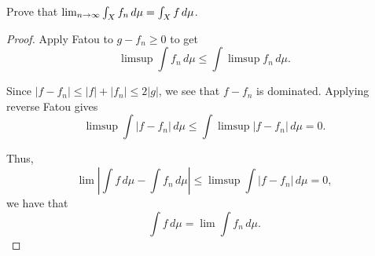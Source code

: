 \begin{itemize}
Prove that $\lim_{n \rightarrow \infty} \int_{X} f_n \, d\mu = \int_X f \, d\mu$. 
 
\begin{proof}
Apply Fatou to $g-f_n \geq 0$ to get \[\limsup\int f_n \, d\mu \leq \int\limsup f_n \, d\mu.\]

Since $|f-f_n| \leq |f| + |f_n| \leq 2|g|$, we see that $f-f_n$ is dominated. Applying reverse Fatou gives
\[\limsup\int |f-f_n| \, d\mu \leq \int\limsup |f-f_n| \, d\mu = 0.\]

Thus, 
\[\lim \left| \int f \, d\mu - \int f_n \, d\mu \right| \leq \limsup\int |f-f_n| \, d\mu = 0,\]
we have that 
\[\int f \, d\mu = \lim \int f_n \, d\mu.\]
\end{proof}





\end{itemize}

